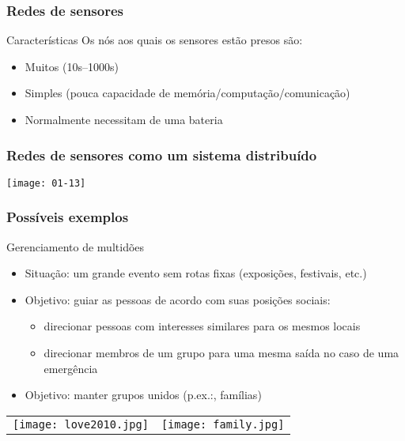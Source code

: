 \documentclass[Ligatures=TeX,table,brazil,svgnames,usetotalslideindicator,compress,10pt]{beamer}
\begin{document}
\begin{frame}
  \frametitle{Redes de sensores}
  \begin{block}{Características}
    Os nós aos quais os sensores estão presos são:
    \begin{itemize}
    \item Muitos (10s--1000s)
    \item Simples (pouca capacidade de memória/computação/comunicação)
    \item Normalmente necessitam de uma bateria
    \end{itemize}
  \end{block}
\end{frame}

\begin{frame}
  \frametitle{Redes de sensores como um sistema distribuído}
  \begin{center}
    \texttt{[image: 01-13]}
  \end{center}
\end{frame}

\begin{frame}
  \frametitle{Possíveis exemplos}
  
  \begin{block}{Gerenciamento de multidões}
    \begin{itemize}
    \item \alert{Situação:} um grande evento sem rotas fixas (exposições, festivais, etc.)
    \item \alert{Objetivo:} guiar as pessoas de acordo com suas posições sociais:
      \begin{itemize}
      \item direcionar pessoas com interesses similares para os mesmos locais
      \item direcionar membros de um grupo para uma mesma saída no caso de uma emergência 
      \end{itemize}
    \item \alert{Objetivo:} manter grupos unidos (p.ex.:, famílias)
    \end{itemize}
  \end{block}

  \vspace{-1em}
  \begin{center}
    \begin{tabular}{cc}
      \texttt{[image: love2010.jpg]} &
      \texttt{[image: family.jpg]} 
    \end{tabular}
  \end{center}

\end{frame}
\end{document}
